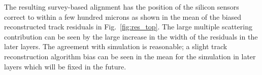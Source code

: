 The resulting survey-based alignment has the position of the silicon sensors correct to within a few hundred 
microns as shown in the mean of the biased reconstructed track residuals in Fig.~\ref{fig:res_top}.  The large multiple scattering contribution can be seen by the large increase in the width of the residuals in the later layers. The agreement with simulation is reasonable; a slight track reconstruction algorithm bias can be seen in the mean for the simulation in later layers which will be fixed in the future. 
